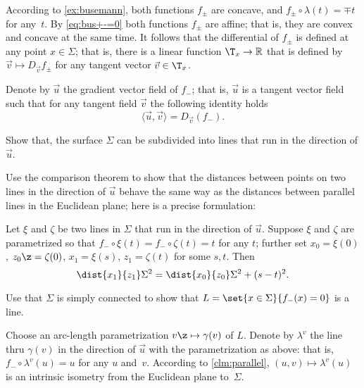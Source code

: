 According to \ref{ex:busemann}, 
both functions $f_\pm$ are concave, and $f_\pm\circ\lambda(t)=\mp t$ for any~$t$.
By \ref{eq:bus+-=0} both functions $f_\pm$ are affine;
that is, they are convex and concave at the same time.
It follows that the differential of $f_\pm$ is defined at any point $x\in\Sigma$;
that is, there is a linear function $\T_x\to\mathbb{R}$ that is defined by
$\vec v\mapsto D_{\vec v}f_\pm$
for any tangent vector $\vec v \in \T_x$.

Denote by $\vec u$ the gradient vector field of $f_-$;
that is, $\vec u$ is a tangent vector field such that for any tangent field $\vec v$ the following identity holds
\[\langle\vec u,\vec v\rangle=D_{\vec v}(f_-).\]

Show that, the surface $\Sigma$ can be subdivided into lines that run in the direction of $\vec u$.

Use the comparison theorem to show that the distances between points on two lines in the direction of $\vec u$ behave the same way as the distances between parallel lines in the Euclidean plane; here is a precise formulation:

\begin{clm}{}\label{clm:parallel}
Let $\xi$ and $\zeta$ be two lines in $\Sigma$ that run in the direction of $\vec u$.
Suppose $\xi$ and $\zeta$ are parametrized so that $f_-\circ \xi(t)=f_-\circ \zeta(t)=t$ for any $t$;
further set $x_0=\xi(0)$, $z_0\z=\zeta(0)$, $x_1=\xi(s)$, $z_1=\zeta(t)$ for some $s,t$. 
Then
\[\dist{x_1}{z_1}\Sigma^2=\dist{x_0}{z_0}\Sigma^2+(s-t)^2.\]
\end{clm}

Use that $\Sigma$ is simply connected to show that 
$L=\set{x\in\Sigma}{f_-(x)=0}$
is a line.

Choose an arc-length parametrization $v\z\mapsto\gamma(v)$ of $L$.
Denote by $\lambda^v$ the line thru $\gamma(v)$ in the direction of $\vec u$ with the parametrization as above: that is, $f_-\circ\lambda^v(u)=u$ for any $u$ and~$v$.
According to \ref{clm:parallel}, $(u,v)\mapsto \lambda^v(u)$ is an intrinsic isometry from the Euclidean plane to~$\Sigma$.

















